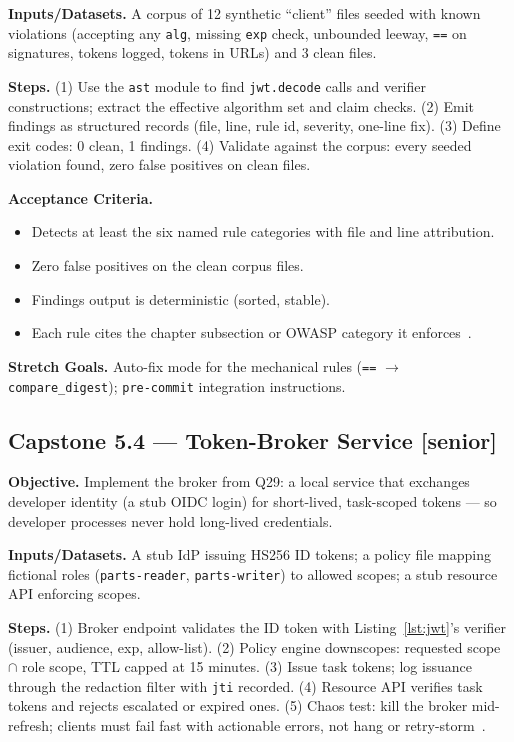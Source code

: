 \textbf{Inputs/Datasets.} A corpus of 12 synthetic ``client'' files seeded
with known violations (accepting any \texttt{alg}, missing \texttt{exp}
check, unbounded leeway, \texttt{==} on signatures, tokens logged, tokens in
URLs) and 3 clean files.

\textbf{Steps.} (1) Use the \texttt{ast} module to find \texttt{jwt.decode}
calls and verifier constructions; extract the effective algorithm set and
claim checks. (2) Emit findings as structured records (file, line, rule id,
severity, one-line fix). (3) Define exit codes: 0 clean, 1 findings.
(4) Validate against the corpus: every seeded violation found, zero false
positives on clean files.

\textbf{Acceptance Criteria.}
\begin{itemize}
  \item[$\square$] Detects at least the six named rule categories with file
        and line attribution.
  \item[$\square$] Zero false positives on the clean corpus files.
  \item[$\square$] Findings output is deterministic (sorted, stable).
  \item[$\square$] Each rule cites the chapter subsection or OWASP category
        it enforces~\cite{owaspapisecurity}.
\end{itemize}

\textbf{Stretch Goals.} Auto-fix mode for the mechanical rules
(\texttt{==} $\rightarrow$ \texttt{compare\_digest}); \texttt{pre-commit}
integration instructions.

\subsection*{Capstone 5.4 --- Token-Broker Service \textbf{[senior]}}

\textbf{Objective.} Implement the broker from Q29: a local service that
exchanges developer identity (a stub OIDC login) for short-lived,
task-scoped tokens --- so developer processes never hold long-lived
credentials.

\textbf{Inputs/Datasets.} A stub IdP issuing HS256 ID tokens; a policy file
mapping fictional roles (\texttt{parts-reader}, \texttt{parts-writer}) to
allowed scopes; a stub resource API enforcing scopes.

\textbf{Steps.} (1) Broker endpoint validates the ID token with
Listing~\ref{lst:jwt}'s verifier (issuer, audience, exp, allow-list).
(2) Policy engine downscopes: requested scope $\cap$ role scope, TTL capped
at 15 minutes. (3) Issue task tokens; log issuance through the redaction
filter with \texttt{jti} recorded. (4) Resource API verifies task tokens and
rejects escalated or expired ones. (5) Chaos test: kill the broker
mid-refresh; clients must fail fast with actionable errors, not hang or
retry-storm~\cite{nygard2018releaseit}.


